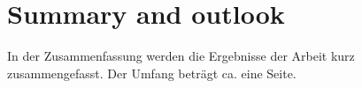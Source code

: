 
\chapter{Summary and outlook}
\label{chap:summary}

In der Zusammenfassung werden die Ergebnisse der Arbeit kurz zusammengefasst. Der
Umfang beträgt ca. eine Seite.